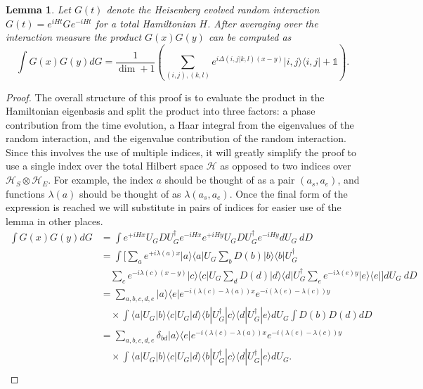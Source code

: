 \documentclass[
 amsmath,amssymb,
 aps,
onecolumn, 
nofootinbib]{revtex4-2}
\newtheorem{lemma}[theorem]{Lemma}
\newcommand{\ket}[1]{|#1\rangle}
\newcommand{\bra}[1]{\langle #1|}
\newcommand{\ketbra}[2]{| #1\rangle\! \langle #2|}
\newcommand{\parens}[1]{\left( #1 \right)}
\newcommand{\hilb}{\mathcal{H}}
\newcommand{\identity}{\mathds{1}}
\begin{document}
\begin{lemma} \label{lem:two_heisenberg_interactions}
    Let $G(t)$ denote the Heisenberg evolved random interaction $G(t) = e^{iHt} G e^{-iHt}$ for a total Hamiltonian $H$. After averaging over the interaction measure the product $G(x) G(y)$ can be computed as
    \begin{equation}
        \int G(x) G(y) dG = \frac{1}{\dim + 1} \parens{\sum_{(i,j),(k,l)} e^{i \Delta(i,j|k,l) (x-y)} \ketbra{i,j}{i,j} + \identity}.
    \end{equation}
\end{lemma}
\begin{proof}
The overall structure of this proof is to evaluate the product in the Hamiltonian eigenbasis and split the product into three factors: a phase contribution from the time evolution, a Haar integral from the eigenvalues of the random interaction, and the eigenvalue contribution of the random interaction. Since this involves the use of multiple indices, it will greatly simplify the proof to use a single index over the total Hilbert space $\hilb$ as opposed to two indices over $\hilb_S \otimes \hilb_E$. For example, the index $a$ should be thought of as a pair $(a_s, a_e)$, and functions $\lambda(a)$ should be thought of as $\lambda(a_s, a_e)$. Once the final form of the expression is reached we will substitute in pairs of indices for easier use of the lemma in other places.
    \begin{align}
        \int G(x) G(y) dG &= \int e^{+i H x} U_G D U_G^\dagger e^{-i H x} e^{+i H y} U_G D U_G^\dagger e^{-i H y} dU_G ~dD \\
        &= \int \bigg[\sum_a e^{+i \lambda(a)x}\ketbra{a}{a}  U_G \sum_b D(b)\ketbra{b}{b} U_G^\dagger \nonumber \\
        &\quad \sum_c e^{-i \lambda(c) (x - y)} \ketbra{c}{c} U_G \sum_d D(d)\ketbra{d}{d} U_G^\dagger \sum_e e^{-i \lambda(e) y} \ketbra{e}{e} \bigg] dU_G ~dD\\
        &=\sum_{a,b,c,d,e} \ketbra{a}{e} e^{-i (\lambda(c) - \lambda(a))x} e^{-i (\lambda(e) - \lambda(c))y} \nonumber \\
        &\quad \times \int \bra{a} U_G \ket{b} \bra{c} U_G \ket{d} \bra{b} U_G^{\dagger} \ket{c} \bra{d} U_G^\dagger \ket{e} dU_G \int D(b) D(d) dD \\
        &=  \sum_{a, b, c, d, e} \delta_{bd} \ketbra{a}{e} e^{-i (\lambda(c) - \lambda(a))x} e^{-i (\lambda(e) - \lambda(c))y} \nonumber \\
        &\quad \times \int \bra{a} U_G \ket{b} \bra{c} U_G \ket{d} \bra{b} U_G^{\dagger} \ket{c} \bra{d} U_G^\dagger \ket{e} dU_G. \\

\end{align}
\end{proof}
\end{document}
